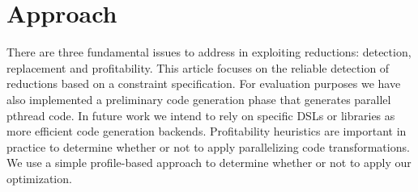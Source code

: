 




\section{Approach}

There are three fundamental issues to address in exploiting
reductions: detection, replacement and profitability.  This article
focuses on the reliable detection of reductions based on a constraint
specification.  For evaluation purposes we have also implemented a
preliminary code generation phase that generates parallel pthread
code.  In future work we intend to rely on specific DSLs or libraries
as more efficient code generation backends.  Profitability heuristics
are important in practice to determine whether or not to apply
parallelizing code transformations.  We use a simple profile-based
approach to determine whether or not to apply our optimization.

